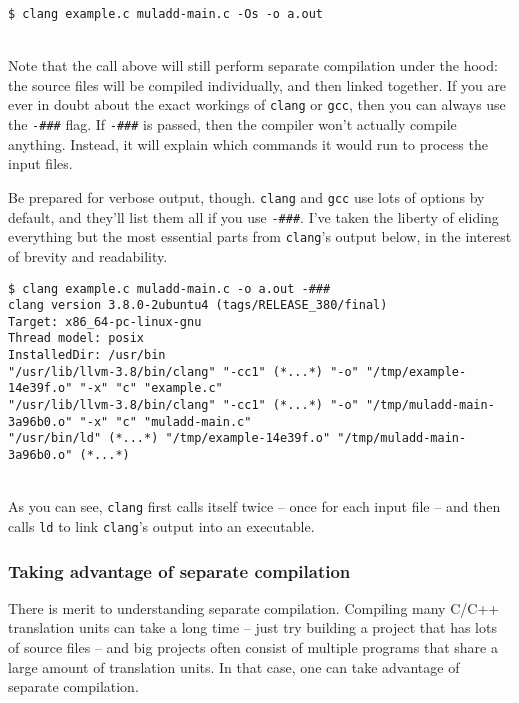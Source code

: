 \documentclass[12pt,a4paper]{article}
\newcommand{\C}{C}
\newcommand{\Cpp}{C++}
\newcommand{\CCpp}{\C/\Cpp}
\newcommand{\gcc}{\texttt{gcc}}
\newcommand{\clang}{\texttt{clang}}
\newcommand{\CC}{\clang{}}
\newcommand{\syslinker}{\texttt{ld}}
\newcommand{\filename}[1]{\texttt{#1}}
\begin{document}
\begin{lstlisting}[caption=compiling and linking \filename{example.c} and \filename{muladd-main.c} directly]
$ clang example.c muladd-main.c -Os -o a.out
\end{lstlisting}
\ \\
Note that the call above will still perform separate compilation under the hood: the source files will be compiled individually, and then linked together. If you are ever in doubt about the exact workings of \clang{} or \gcc{}, then you can always use the \texttt{-\#\#\#} flag. If \texttt{-\#\#\#} is passed, then the compiler won't actually compile anything. Instead, it will explain which commands it would run to process the input files. 

Be prepared for verbose output, though. \clang{} and \gcc{} use lots of options by default, and they'll list them all if you use \texttt{-\#\#\#}. I've taken the liberty of eliding everything but the most essential parts from \CC{}'s output below, in the interest of brevity and readability.\\

\begin{lstlisting}[caption=filtered output for \texttt{clang -\#\#\#}]
$ clang example.c muladd-main.c -o a.out -###
clang version 3.8.0-2ubuntu4 (tags/RELEASE_380/final)
Target: x86_64-pc-linux-gnu
Thread model: posix
InstalledDir: /usr/bin
"/usr/lib/llvm-3.8/bin/clang" "-cc1" (*...*) "-o" "/tmp/example-14e39f.o" "-x" "c" "example.c"
"/usr/lib/llvm-3.8/bin/clang" "-cc1" (*...*) "-o" "/tmp/muladd-main-3a96b0.o" "-x" "c" "muladd-main.c"
"/usr/bin/ld" (*...*) "/tmp/example-14e39f.o" "/tmp/muladd-main-3a96b0.o" (*...*)
\end{lstlisting}
\ \\
As you can see, \CC{} first calls itself twice -- once for each input file -- and then calls \syslinker{} to link \CC{}'s output into an executable.

\subsubsection{Taking advantage of separate compilation}

There is merit to understanding separate compilation. Compiling many \CCpp{} translation units can take a long time -- just try building a project that has lots of source files -- and big projects often consist of multiple programs that share a large amount of translation units. In that case, one can take advantage of separate compilation.
\end{document}
